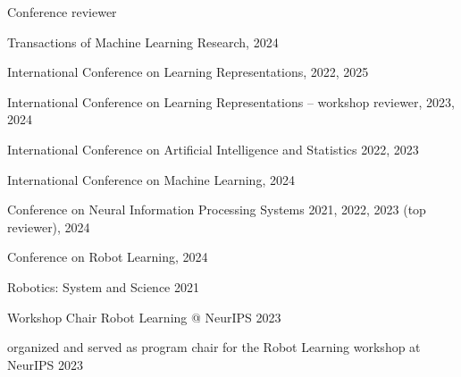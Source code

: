 
\begin{cventries}
  \cventry
    {} %
    {Conference reviewer} %
    {} %
    {} %
    {
	\begin{cvitems}
  \item {Transactions of Machine Learning Research, 2024}
	\item {International Conference on Learning Representations, 2022, 2025}
	\item {International Conference on Learning Representations -- workshop reviewer, 2023, 2024}
	\item {International Conference on Artificial Intelligence and Statistics 2022, 2023}
	\item {International Conference on Machine Learning, 2024}
	\item {Conference on Neural Information Processing Systems 2021, 2022, 2023 (top reviewer), 2024} %
	\item {Conference on Robot Learning, 2024}
	\item {Robotics: System and Science 2021} %
	\end{cvitems}
    }

\end{cventries}


  \cventry
    {Workshop Chair} %
    {Robot Learning @ NeurIPS} %
    {}
    {2023} %
    {
      \begin{cvitems} %
      	\item {organized and served as program chair for the Robot Learning workshop at NeurIPS 2023}
      \end{cvitems}
    }


